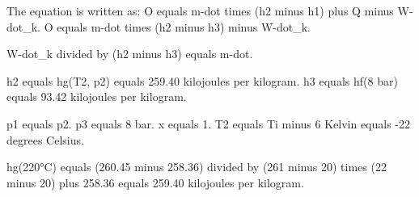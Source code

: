 The equation is written as:  
O equals m-dot times (h2 minus h1) plus Q minus W-dot_k.  
O equals m-dot times (h2 minus h3) minus W-dot_k.  

W-dot_k divided by (h2 minus h3) equals m-dot.  

h2 equals hg(T2, p2) equals 259.40 kilojoules per kilogram.  
h3 equals hf(8 bar) equals 93.42 kilojoules per kilogram.  

p1 equals p2.  
p3 equals 8 bar.  
x equals 1.  
T2 equals Ti minus 6 Kelvin equals -22 degrees Celsius.  

hg(220°C) equals (260.45 minus 258.36) divided by (261 minus 20) times (22 minus 20) plus 258.36 equals 259.40 kilojoules per kilogram.